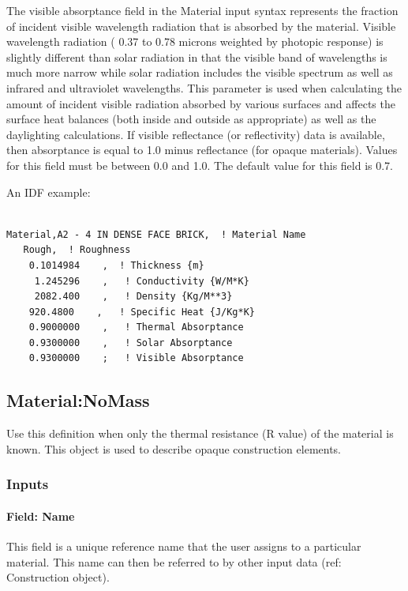 The visible absorptance field in the Material input syntax represents the fraction of incident visible wavelength radiation that is absorbed by the material. Visible wavelength radiation ( 0.37 to 0.78 microns weighted by photopic response) is slightly different than solar radiation in that the visible band of wavelengths is much more narrow while solar radiation includes the visible spectrum as well as infrared and ultraviolet wavelengths. This parameter is used when calculating the amount of incident visible radiation absorbed by various surfaces and affects the surface heat balances (both inside and outside as appropriate) as well as the daylighting calculations. If visible reflectance (or reflectivity) data is available, then absorptance is equal to 1.0 minus reflectance (for opaque materials). Values for this field must be between 0.0 and 1.0. The default value for this field is 0.7.

An IDF example:

\begin{lstlisting}

Material,A2 - 4 IN DENSE FACE BRICK,  ! Material Name
   Rough,  ! Roughness
    0.1014984    ,  ! Thickness {m}
     1.245296    ,   ! Conductivity {W/M*K}
     2082.400    ,   ! Density {Kg/M**3}
    920.4800    ,   ! Specific Heat {J/Kg*K}
    0.9000000    ,   ! Thermal Absorptance
    0.9300000    ,   ! Solar Absorptance
    0.9300000    ;   ! Visible Absorptance
\end{lstlisting}

\subsection{Material:NoMass}\label{materialnomass}

Use this definition when only the thermal resistance (R value) of the material is known. This object is used to describe opaque construction elements.

\subsubsection{Inputs}\label{inputs-1-043}

\paragraph{Field: Name}\label{field-name-1-042}

This field is a unique reference name that the user assigns to a particular material. This name can then be referred to by other input data (ref: Construction object).

